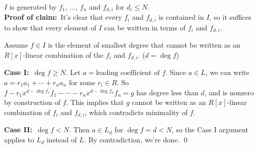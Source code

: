 \claim $I$ is generated by $f_1$, $\dotsc$, $f_n$ and $f_{d,i}$ for $d_i\leq N$. \\
\textbf{Proof of claim:}~It's clear that every $f_i$ and $f_{d,i}$ is contained in $I$, so it suffices to show that every element of $I$ can be written in terms of $f_i$ and $f_{d,i}$.

Assume $f\in I$ is the element of smallest degree that cannot be written as an $R[x]$-linear combination of the $f_i$ and $f_{d,i}$. ($d=\deg f$)

\textbf{Case I:}~$\deg f\geq N$.  Let $a=\text{leading coefficient of $f$}$.  Since $a\in L$, we can write $a=r_1a_1+\dotsb+r_na_n$ for some $r_i\in R$.  So $f-r_1x^{d-\deg f_1}f_1-\dotsb-r_n x^{d-\deg f_n}f_n=g$ has degree less than $d$, and is nonzero by construction of $f$.  This implies that $g$ cannot be written as an $R[x]$-linear combination of $f_i$ and $f_{d,i}$, which contradicts minimality of $f$.

\textbf{Case II:}~$\deg f< N$.  Then $a\in L_d$ for $\deg f=d<N$, so the Case I argument applies to $L_d$ instead of $L$.  By contradiction, we're done. \qed
